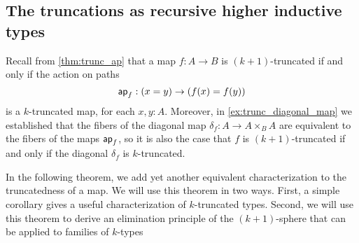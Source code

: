 \begin{comment}
\begin{proof}
We have to show that $\fib{f}{x}$ is $\susp(M)$-connected for each $x:X$. 
Since this is a mere proposition, and we assume that $f$ is surjective, it
is equivalent to show that $\fib{f}{f(a)}$ is $\susp(M)$-connected for each $a:A$. 
Let $Y$ be a $\susp(M)$-null type. 
For every $g:\fib{f}{f(a)}\to Y$ be a map we have the point $\theta(g)\defeq g(a,\refl{f(a)})$ in $Y$,
so we obtain a map
\begin{equation*}
\theta : (\fib{f}{f(a)}\to Y)\to Y
\end{equation*}
It is clear that $\theta(\lam{\pairr{b,p}}y)=y$, so it remains to show that
for every $g:\fib{f}{f(a)}\to Y$ we have $\lam{\pairr{b,p}}\theta(g)=g$.
That is, we must show that
\begin{equation*}
\prd{b:A}{p:f(a)=f(b)} g(a,\refl{f(a)})=g(b,p).
\end{equation*}
Using the assumption that $Y$ is $\susp(M)$-connected, it follows from
\cref{lem:local_id} that the type $g(a,\refl{f(a)})=g(b,p)$ is $M$-connected,
for every $b:A$ and $p:f(a)=f(b)$.
Therefore it follows, since the map $\mapfunc{f}(a,b):(a=b)\to(f(a)=f(b))$ is connected, that our goal is equivalent to
\begin{equation*}
\prd{b:A}{p:a=b} g(a,\refl{f(a)})=g(b,\mapfunc{f}(a,b,p)).
\end{equation*}
This follows by path induction. 
\end{proof}
\end{comment}

\subsection{The truncations as recursive higher inductive types}

Recall from \cref{thm:trunc_ap} that a map $f:A\to B$ is $(k+1)$-truncated if and only if the action on paths
\begin{equation*}
  \mathsf{ap}_{f}:(x=y)\to(f(x)=f(y))
\end{equation*}
is a $k$-truncated map, for each $x,y:A$. Moreover, in \cref{ex:trunc_diagonal_map} we established that the fibers of the diagonal map $\delta_f:A\to A\times_BA$ are equivalent to the fibers of the maps $\mathsf{ap}_{f}$, so it is also the case that $f$ is $(k+1)$-truncated if and only if the diagonal $\delta_f$ is $k$-truncated.

In the following theorem, we add yet another equivalent characterization to the truncatedness of a map. We will use this theorem in two ways. First, a simple corollary gives a useful characterization of $k$-truncated types. Second, we will use this theorem to derive an elimination principle of the $(k+1)$-sphere that can be applied to families of $k$-types


